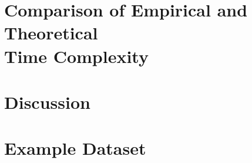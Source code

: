 \documentclass[12pt]{article}
\begin{document}
\section[Comparison of Empirical and Theoretical Time Complexity]{Comparison of Empirical and Theoretical \\ Time Complexity}

\section{Discussion}

\section{Example Dataset}
\end{document}
